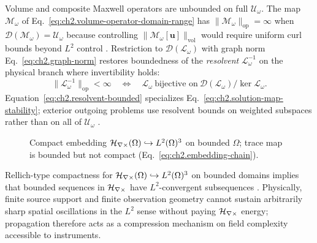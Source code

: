 Volume and composite Maxwell operators are unbounded on full \(\mathcal{U}_\omega\). The map \(\mathcal{M}_\omega\) of Eq.~\eqref{eq:ch2.volume-operator-domain-range} has \(\|\mathcal{M}_\omega\|_{\mathrm{op}}=\infty\) when \(\mathcal{D}(\mathcal{M}_\omega)=\mathcal{U}_\omega\) because controlling \(\|\mathcal{M}_\omega[\mathbf{u}]\|_{\mathrm{vol}}\) would require uniform curl bounds beyond \(L^{2}\) control \cite{stratton1941}. Restriction to \(\mathcal{D}(\mathcal{L}_\omega)\) with graph norm Eq.~\eqref{eq:ch2.graph-norm} restores boundedness of the \emph{resolvent} \(\mathcal{L}_\omega^{-1}\) on the physical branch where invertibility holds:
\begin{equation}
\label{eq:ch2.resolvent-bounded}
\|\mathcal{L}_\omega^{-1}\|_{\mathrm{op}}
<\infty
\quad\Longleftrightarrow\quad
\mathcal{L}_\omega\ \text{bijective on}\ \mathcal{D}(\mathcal{L}_\omega)/\ker\mathcal{L}_\omega.
\end{equation}
Equation~\eqref{eq:ch2.resolvent-bounded} specializes Eq.~\eqref{eq:ch2.solution-map-stability}; exterior outgoing problems use resolvent bounds on weighted subspaces rather than on all of \(\mathcal{U}_\omega\) \cite{harrington2001}.
\begin{figure}[t]
\centering
{}
\caption{Compact embedding \(\mathcal{H}_{\nabla\times}(\Omega)\hookrightarrow L^{2}(\Omega)^{3}\) on bounded \(\Omega\); trace map is bounded but not compact (Eq.~\eqref{eq:ch2.embedding-chain}).}
\label{fig:ch2.compact-embedding-schematic}
\end{figure}
Rellich-type compactness for \(\mathcal{H}_{\nabla\times}(\Omega)\hookrightarrow L^{2}(\Omega)^{3}\) on bounded domains implies that bounded sequences in \(\mathcal{H}_{\nabla\times}\) have \(L^{2}\)-convergent subsequences \cite{stratton1941}. Physically, finite source support and finite observation geometry cannot sustain arbitrarily sharp spatial oscillations in the \(L^{2}\) sense without paying \(\mathcal{H}_{\nabla\times}\) energy; propagation therefore acts as a compression mechanism on field complexity accessible to instruments.

